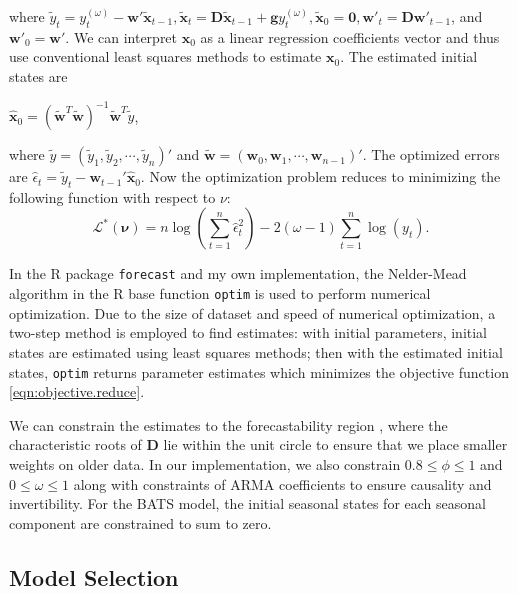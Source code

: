 \documentclass{uwstat572}
\begin{document}
where $ \tilde{y}_t=y_t^{(\omega)}- \textbf{w}' \tilde{\textbf{x}}_{t-1}, \tilde{\textbf{x}}_t=\textbf{D}\tilde{\textbf{x}}_{t-1}+\textbf{g}y_t^{(\omega)}, \tilde{\textbf{x}}_0=\textbf{0}, \textbf{w}'_{t}=\textbf{D}\textbf{w}'_{t-1}$, and $\textbf{w}'_{0}=\textbf{w}'$. We can interpret $\textbf{x}_0$ as a linear regression coefficients vector and thus use conventional least squares methods to estimate $\textbf{x}_0$. The estimated initial states are 
\begin{center}
$\displaystyle \hat{\textbf{x}}_0 = (\tilde{\textbf{w}}^T \tilde{\textbf{w}})^{-1}\tilde{\textbf{w}}^T \tilde{y}$,
\end{center}
where $\tilde{y}=(\tilde{y}_1 ,\tilde{y}_2  , \cdots , \tilde{y}_n )' $ and $\tilde{\textbf{w}}=(\textbf{w}_0 ,\textbf{w}_1  ,\cdots , \textbf{w}_{n-1})'$. The optimized errors are $\hat{\epsilon}_t=\tilde{y}_t-\textbf{w}_{t-1}' \hat{\textbf{x}}_0$. Now the optimization problem reduces to minimizing the following function with respect to $\nu$:
\begin{equation}
\mathcal{L}^{*}(\bm{\nu})=n \log (\sum\limits_{t=1}^n \hat{\epsilon}_t^2)-2(\omega-1) \sum\limits_{t=1}^n \log(y_t).
\label{eqn:objective.reduce}
\end{equation}

In the R package \texttt{forecast} and my own implementation, the Nelder-Mead algorithm in the R base function \texttt{optim} is used to perform numerical optimization. Due to the size of dataset and speed of numerical optimization, a two-step method is employed to find estimates: with initial parameters, initial states are estimated using least squares methods; then with the estimated initial states, \texttt{optim} returns parameter estimates which minimizes the objective function \ref{eqn:objective.reduce}. 

We can constrain the estimates to the forecastability region \citet{hyndman2008admissible}, where the characteristic roots of $\textbf{D}$ lie within the unit circle to ensure that we place smaller weights on older data. In our implementation, we also constrain $0.8\leq \phi \leq 1$ and $0 \leq \omega \leq 1$ along with constraints of ARMA coefficients to ensure causality and invertibility. For the BATS model, the initial seasonal states for each seasonal component are constrained to sum to zero. 

\subsection{Model Selection}
\label{sec:selection}
\end{document}
